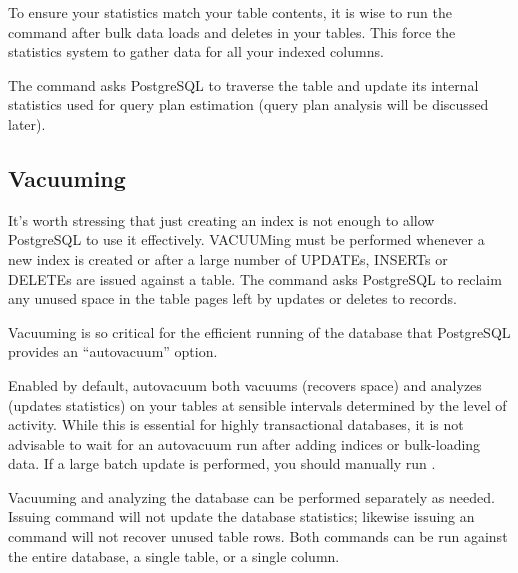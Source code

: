 \documentclass[a4paper,11pt,english]{sphinxmanual}
\begin{document}
To ensure your statistics match your table contents, it is wise to run the  command after bulk data loads and deletes in your tables. This force the statistics system to gather data for all your indexed columns.

The  command asks PostgreSQL to traverse the table and update its internal statistics used for query plan estimation (query plan analysis will be discussed later).

\begin{sphinxVerbatim}[commandchars=\\\{\}]
 
\end{sphinxVerbatim}


\subsection{Vacuuming}
\label{\detokenize{basic:vacuuming}}
It’s worth stressing that just creating an index is not enough to allow PostgreSQL to use it effectively.  VACUUMing must be performed whenever a new index is created or after a large number of UPDATEs, INSERTs or DELETEs are issued against a table.  The  command asks PostgreSQL to reclaim any unused space in the table pages left by updates or deletes to records.

Vacuuming is so critical for the efficient running of the database that PostgreSQL provides an “autovacuum” option.

Enabled by default, autovacuum both vacuums (recovers space) and analyzes (updates statistics) on your tables at sensible intervals determined by the level of activity.  While this is essential for highly transactional databases, it is not advisable to wait for an autovacuum run after adding indices or bulk-loading data.  If a large batch update is performed, you should manually run .

Vacuuming and analyzing the database can be performed separately as needed.  Issuing  command will not update the database statistics; likewise issuing an  command will not recover unused table rows.  Both commands can be run against the entire database, a single table, or a single column.

\begin{sphinxVerbatim}[commandchars=\\\{\}]
  
\end{sphinxVerbatim}
\end{document}
